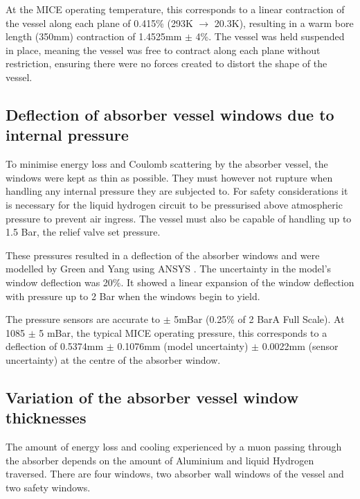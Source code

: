 At the MICE operating temperature, this corresponds to a linear contraction of the vessel along each plane of 0.415\%
(293K $\mathrm{\to}$ 20.3K), resulting in a warm bore length (350mm) contraction of 1.4525mm
$\mathrm{\pm}$ 4\%. The vessel was held suspended in place, meaning the vessel was free to contract along
each plane without restriction, ensuring there were no forces created to distort the shape of the vessel.


\subsection{Deflection of absorber vessel windows due to internal pressure}
\label{SubSect:Absorber_pressure}

To minimise energy loss and Coulomb scattering by the absorber vessel, the windows were kept as thin as
possible. They must however not rupture when handling any internal pressure they are subjected to. For
safety considerations \cite{1748-0221-13-09-T09008} \cite{Ishimoto} it is necessary for the liquid hydrogen
circuit to be pressurised above atmospheric pressure to prevent air ingress. The vessel must also be
capable of handling up to 1.5 Bar, the relief valve set pressure.

These pressures resulted in a deflection of the absorber windows and were modelled by Green and Yang using
ANSYS \cite{NOTE155}. The uncertainty in the model's window deflection was 20\%. It showed a linear
expansion of the window deflection with pressure up to 2 Bar when the windows begin to yield. 

 The pressure sensors are accurate to $\mathrm{\pm}$ 5mBar (0.25\% of 2 BarA Full Scale). At 1085
 $\mathrm{\pm}$ 5 mBar, the typical MICE operating pressure, this corresponds to a deflection of 0.5374mm
 $\mathrm{\pm}$ 0.1076mm (model uncertainty) $\mathrm{\pm}$ 0.0022mm (sensor uncertainty) at the centre of
 the absorber window.

\subsection{Variation of the absorber vessel window thicknesses}
\label{SubSect:Absorber_thickness}

The amount of energy loss and cooling experienced by a muon passing through the absorber depends on the amount of
Aluminium and liquid Hydrogen traversed. There are four windows, two absorber wall windows of the vessel and two safety windows.

